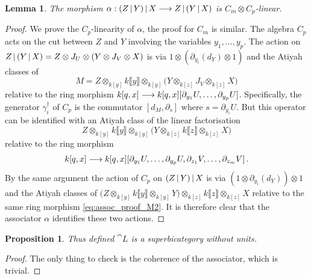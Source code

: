 \documentclass[english,letter paper,12pt,leqno]{article}
\newtheorem{proposition}[theorem]{Proposition}
\newtheorem{lemma}[theorem]{Lemma}
\theoremstyle{example}
\numberwithin{equation}{section}
\begin{document}
\begin{lemma}\label{lemma:associator} The morphism $\alpha: (Z \,|\, Y) \,|\, X \longrightarrow Z \,|\, (Y \,|\, X)$ is $C_m \otimes C_p$-linear.
\end{lemma}
\begin{proof}
We prove the $C_p$-linearity of $\alpha$, the proof for $C_m$ is similar. The algebra $C_p$ acts on the cut between $Z$ and $Y$ involving the variables $y_1,\ldots,y_p$. The action on $Z \,|\, ( Y \,|\, X ) = Z \otimes J_U \otimes (Y \otimes J_V \otimes X)$ is via $1 \otimes (\partial_{y_i}(d_Y) \otimes 1)$ and the Atiyah classes of 
\[
M = Z \otimes_{k[y]} k\llbracket y \rrbracket \otimes_{k[y]} \big( Y \otimes_{k[z]} J_V \otimes_{k[z]} X \big)
\]
relative to the ring morphism $k[q,x] \longrightarrow k[q,x] [ \partial_{y_1} U, \ldots, \partial_{y_p} U ]$. Specifically, the generator $\gamma_i^{\dagger}$ of $C_p$ is the commutator $[d_{M}, \partial_s]$ where $s = \partial_{y_i} U$. But this operator can be identified with an Atiyah class of the linear factorisation
\begin{equation}\label{eq:assoc_proof_M}
Z \otimes_{k[y]} k\llbracket y \rrbracket \otimes_{k[y]} \big( Y \otimes_{k[z]} k\llbracket z \rrbracket \otimes_{k[z]} X \big)
\end{equation}
relative to the ring morphism
\begin{equation}\label{eq:assoc_proof_M2}
k[q,x] \longrightarrow k[q,x] [ \partial_{y_1} U, \ldots, \partial_{y_p} U, \partial_{z_1} V, \ldots, \partial_{z_m} V ]\,.
\end{equation}
By the same argument the action of $C_p$ on $(Z \,|\, Y ) \,|\, X$ is via $(1 \otimes \partial_{y_i}(d_Y)) \otimes 1$ and the Atiyah classes of $\big( Z \otimes_{k[y]} k\llbracket y \rrbracket \otimes_{k[y]} Y \big) \otimes_{k[z]} k\llbracket z \rrbracket \otimes_{k[z]} X$ relative to the same ring morphism \eqref{eq:assoc_proof_M2}. It is therefore clear that the associator $\alpha$ identifies these two actions.
\end{proof}

\begin{proposition} Thus defined $\cat{L}$ is a superbicategory without units.
\end{proposition}
\begin{proof}
The only thing to check is the coherence of the associator, which is trivial.
\end{proof}
\end{document}
